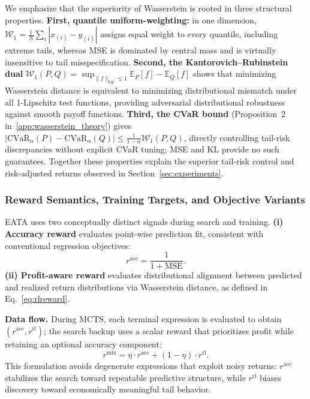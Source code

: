 \documentclass{elektr}
\theoremstyle{corollary}
\theoremstyle{lemma}
\theoremstyle{proposition}
\theoremstyle{axiom}
\theoremstyle{conjecture}
\theoremstyle{example}
\theoremstyle{definition}
\theoremstyle{remark}
\begin{document}
We emphasize that the superiority of Wasserstein is rooted in three structural properties. \textbf{First, quantile uniform-weighting:} in one dimension, $\mathcal{W}_1 = \frac{1}{N}\sum_i |x_{(i)} - y_{(i)}|$ assigns equal weight to every quantile, including extreme tails, whereas MSE is dominated by central mass and is virtually insensitive to tail misspecification. \textbf{Second, the Kantorovich--Rubinstein dual} $\mathcal{W}_1(P,Q) = \sup_{\|f\|_{\text{Lip}} \leq 1} \mathbb{E}_{P}[f] - \mathbb{E}_{Q}[f]$ shows that minimizing Wasserstein distance is equivalent to minimizing distributional mismatch under all 1-Lipschitz test functions, providing adversarial distributional robustness against smooth payoff functions. \textbf{Third, the CVaR bound} (Proposition~2 in~\ref{app:wasserstein_theory}) gives $|\text{CVaR}_\alpha(P) - \text{CVaR}_\alpha(Q)| \leq \frac{1}{1-\alpha}\mathcal{W}_1(P,Q)$, directly controlling tail-risk discrepancies without explicit CVaR tuning; MSE and KL provide no such guarantees. Together these properties explain the superior tail-risk control and risk-adjusted returns observed in Section~\ref{sec:experiments}.

\subsubsection{Reward Semantics, Training Targets, and Objective Variants}
\label{subsec:reward_flow}

EATA uses two conceptually distinct signals during search and training.
\textbf{(i) Accuracy reward} evaluates point-wise prediction fit, consistent with conventional regression objectives:
\begin{equation}
r^{\text{acc}} = \frac{1}{1 + \text{MSE}}.
\label{eq:racc}
\end{equation}
\textbf{(ii) Profit-aware reward} evaluates distributional alignment between predicted and realized return distributions via Wasserstein distance, as defined in Eq.~\ref{eq:rlreward}.

\textbf{Data flow.} During MCTS, each terminal expression is evaluated to obtain $(r^{\text{acc}}, r^{\text{rl}})$; the search backup uses a scalar reward that prioritizes profit while retaining an optional accuracy component:
\begin{equation}
r^{\text{mix}} = \eta \cdot r^{\text{acc}} + (1-\eta) \cdot r^{\text{rl}}.
\label{eq:rmix}
\end{equation}
This formulation avoids degenerate expressions that exploit noisy returns: $r^{\text{acc}}$ stabilizes the search toward repeatable predictive structure, while $r^{\text{rl}}$ biases discovery toward economically meaningful tail behavior.
\end{document}
